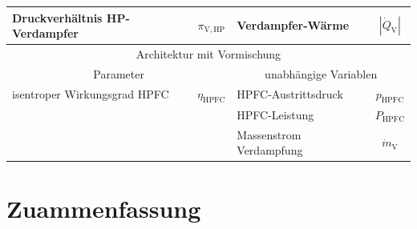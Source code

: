 \begin{table}[ht]
\begin{tabular} {|l|c|l|c|}
    Druckverhältnis HP-Verdampfer & $\pi_\mathrm{V,HP}$ & Verdampfer-Wärme & $|\dot{Q}_\mathrm{V}|$ \\ \hline\hline
    \multicolumn{4}{|c|}{Architektur mit Vormischung}\\ \hline
    \multicolumn{2}{|c}{Parameter} & \multicolumn{2}{|c|}{unabhängige Variablen}\\ \hline\hline%
    isentroper Wirkungsgrad HPFC & $\eta_{\mathrm{HPFC}}$ & HPFC-Austrittsdruck & $p_{\mathrm{HPFC}}$ \\ \hline
    \multicolumn{2}{|c|}{}& HPFC-Leistung & $P_{\mathrm{HPFC}}$ \\ \hline
    \multicolumn{2}{|c|}{}& Massenstrom Verdampfung & $\dot{m}_\mathrm{V}$ \\ \hline
    \end{tabular}	
    \label{Tab:h2_params}%
\end{table}
\FloatBarrier 



\section{Zuammenfassung}




